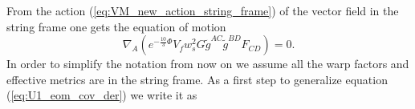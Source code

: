 \documentclass[a4paper,12pt]{article}
\begin{document}

From the action (\ref{eq:VM_new_action_string_frame}) of the vector field in the string frame one gets the equation of motion
\begin{equation}
\nabla_{A} \left(e^{-\frac{10}{3} \Phi} V_f w_s^2 G \tilde{g}^{AC} \tilde{g}^{BD} F_{CD}  \right) = 0.
\label{eq:U1_eom_cov_der}
\end{equation}
In order to simplify the notation from now on we assume all the warp factors and effective metrics are in the string frame.
As a first step to generalize equation (\ref{eq:U1_eom_cov_der}) we write it as
\end{document}
